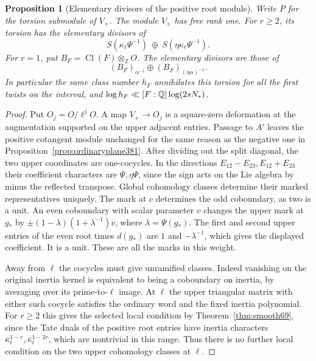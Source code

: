 \documentclass[a4paper,11pt]{article}
\newtheorem{proposition}{Proposition}[section]
\theoremstyle{definition}
\theoremstyle{remark}
\newcommand{\ZZ}{\mathbb Z}\newcommand{\ord}{\operatorname{ord}}
\numberwithin{equation}{section}
\begin{document}
\begin{proposition}[Elementary divisors of the positive root module]
\label{prop:upperorders382}
Write \(P\) for the torsion submodule of \(V_+\). The module
\(V_+\) has free rank one. For \(r\ge2\), its torsion has
the elementary divisors of
\[
 S(\kappa_\ell\Psi^{-1})\ \oplus\ S(\eta\kappa_\ell\Psi^{-1}).
\]
For \(r=1\), put \(B_F=\operatorname{Cl}(F)\otimes_\ZZ O\).
The elementary divisors are those of
\[
       (B_F)_{\alpha^{-1}}\oplus (B_F)_{(\eta\alpha)^{-1}}.
\]
In particular the same class number \(h_F\) annihilates this
torsion for all the first twists on the interval, and
\(\log h_F\ll [F:\mathbb Q]\log(2sN_*)\).
\end{proposition}
\begin{proof}
Put \(O_j=O/\ell^j O\). A map \(V_+\to O_j\) is a
square-zero deformation at the augmentation supported on the
upper adjacent entries. Passage to \(A'\) leaves the positive
cotangent module unchanged for the same reason as the negative
one in Proposition~\ref{prop:ordinaryplane381}.
After dividing out the split diagonal, the two upper coordinates
are one-cocycles. In the directions
\(E_{12}-E_{23},E_{12}+E_{23}\) their coefficient characters
are \(\Psi,\eta\Psi\), since the sign acts on the Lie algebra
by minus the reflected transpose. Global cohomology classes
determine their marked representatives uniquely. The mark at
\(c\) determines the odd coboundary, as two is a unit. An even
coboundary with scalar parameter \(v\) changes the upper
mark at \(g_*\) by \(\pm(1-\lambda)(1+\lambda^{-1})v\),
where \(\lambda=\Psi(g_*)\). The first and second upper
entries of the even root times \(d(g_*)\) are \(1\) and
\(-\lambda^{-1}\), which gives the displayed coefficient.
It is a unit. These are all the marks in this weight.

Away from \(\ell\) the cocycles must give unramified classes.
Indeed vanishing on the original inertia kernel is equivalent
to being a coboundary on inertia, by averaging over its
prime-to-\(\ell\) image. At \(\ell\) the upper triangular
matrix with either such cocycle satisfies the ordinary word
and the fixed inertia polynomial. For \(r\ge2\) this gives
the selected local condition by Theorem~\ref{thm:smooth69}, since
the Tate duals of the positive root entries have inertia
characters \(\bar\kappa_\ell^{1-r},\bar\kappa_\ell^{1-2r}\),
which are nontrivial in this range. Thus there is no further
local condition on the two upper cohomology classes at \(\ell\).


\end{proof}
\end{document}
